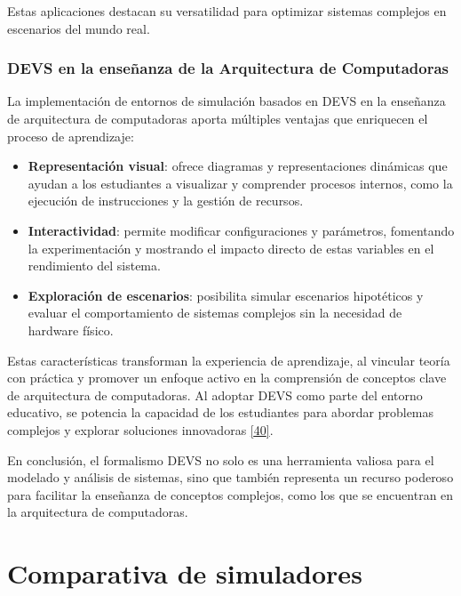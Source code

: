 \documentclass[12pt,oneside]{templates/unerthesis}
\providecommand{\tightlist}{%
  \setlength{\itemsep}{0pt}\setlength{\parskip}{0pt}}
\begin{document}
Estas aplicaciones destacan su versatilidad para optimizar sistemas complejos en escenarios del mundo real.

\hypertarget{devs-en-la-enseuxf1anza-de-la-arquitectura-de-computadoras}{%
\subsection{DEVS en la enseñanza de la Arquitectura de Computadoras}\label{devs-en-la-enseuxf1anza-de-la-arquitectura-de-computadoras}}

La implementación de entornos de simulación basados en DEVS en la enseñanza de arquitectura de computadoras aporta múltiples ventajas que enriquecen el proceso de aprendizaje:

\begin{itemize}
\tightlist
\item
  \textbf{Representación visual}: ofrece diagramas y representaciones dinámicas que ayudan a los estudiantes a visualizar y comprender procesos internos, como la ejecución de instrucciones y la gestión de recursos.
\item
  \textbf{Interactividad}: permite modificar configuraciones y parámetros, fomentando la experimentación y mostrando el impacto directo de estas variables en el rendimiento del sistema.
\item
  \textbf{Exploración de escenarios}: posibilita simular escenarios hipotéticos y evaluar el comportamiento de sistemas complejos sin la necesidad de hardware físico.
\end{itemize}

Estas características transforman la experiencia de aprendizaje, al vincular teoría con práctica y promover un enfoque activo en la comprensión de conceptos clave de arquitectura de computadoras. Al adoptar DEVS como parte del entorno educativo, se potencia la capacidad de los estudiantes para abordar problemas complejos y explorar soluciones innovadoras \protect\hyperlink{ref-calvo_valdes_simulador_2010}{{[}40{]}}.

En conclusión, el formalismo DEVS no solo es una herramienta valiosa para el modelado y análisis de sistemas, sino que también representa un recurso poderoso para facilitar la enseñanza de conceptos complejos, como los que se encuentran en la arquitectura de computadoras.

\hypertarget{comparativa}{%
\chapter{Comparativa de simuladores}\label{comparativa}}
\end{document}
